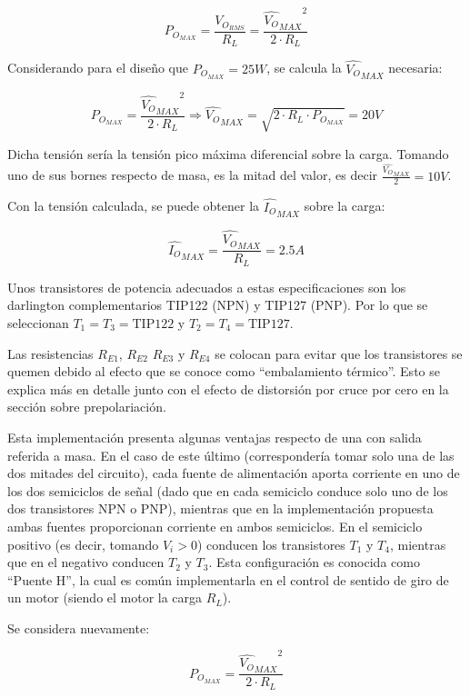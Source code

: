 \[
P_{O_{MAX}} = \frac{V_{O_{RMS}}}{R_L} = \frac{{\hat{V_O}_{MAX}}^2}{2 \cdot R_L}
\]

Considerando para el diseño que $P_{O_{MAX}} = 25W$, se calcula la $\hat{V_O}_{MAX}$ necesaria:

\[
P_{O_{MAX}} = \frac{{\hat{V_O}_{MAX}}^2}{2 \cdot R_L} \Longrightarrow \hat{V_O}_{MAX} = \sqrt{2 \cdot R_L \cdot P_{O_{MAX}}} = 20V
\] 

Dicha tensión sería la tensión pico máxima diferencial sobre la carga. Tomando uno de sus bornes respecto de masa, es la mitad del valor, es decir $\frac{\hat{V_O}_{MAX}}{2} = 10V$.\par
Con la tensión calculada, se puede obtener la $\hat{I_O}_{MAX}$ sobre la carga:

\[
\hat{I_O}_{MAX} = \frac{\hat{V_O}_{MAX}}{R_L} = 2.5A
\]

Unos transistores de potencia adecuados a estas especificaciones son los darlington complementarios TIP122 (NPN) y TIP127 (PNP). Por lo que se seleccionan $T_1 = T_3 = \textrm{TIP122}$ y $T_2 = T_4 = \textrm{TIP127}$.\par
Las resistencias $R_{E1}$, $R_{E2}$ $R_{E3}$ y $R_{E4}$ se colocan para evitar que los transistores se quemen debido al efecto que se conoce como ``embalamiento térmico''. Esto se explica más en detalle junto con el efecto de distorsión por cruce por cero en la sección sobre prepolariación.


Esta implementación presenta algunas ventajas respecto de una con salida referida a masa. En el caso de este último (correspondería tomar solo una de las dos mitades del circuito), cada fuente de alimentación aporta corriente en uno de los dos semiciclos de señal (dado que en cada semiciclo conduce solo uno de los dos transistores NPN o PNP), mientras que en la implementación propuesta ambas fuentes proporcionan corriente en ambos semiciclos. En el semiciclo positivo (es decir, tomando $V_i > 0$) conducen los transistores $T_1$ y $T_4$, mientras que en el negativo conducen $T_2$ y $T_3$. Esta configuración es conocida como ``Puente H'', la cual es común implementarla en el control de sentido de giro de un motor (siendo el motor la carga $R_L$).\par
Se considera nuevamente:

\[
P_{O_{MAX}} = \frac{{\hat{V_O}_{MAX}}^2}{2 \cdot R_L}
\]

